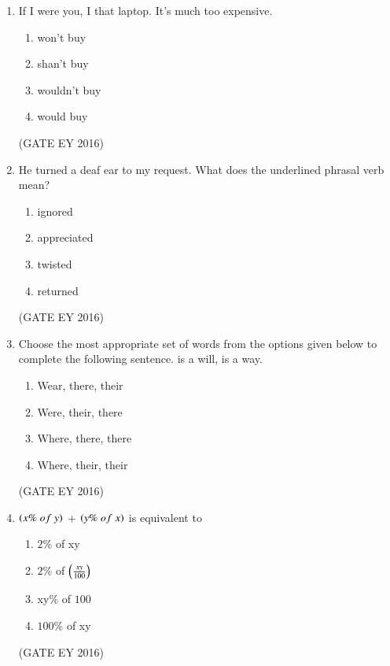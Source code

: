 \documentclass[journal]{IEEEtran}
\begin{document}
\begin{enumerate}[label=Q.\arabic*.]
    \item If I were you, I \underline{\hspace{3cm}} that laptop. It's much too expensive.
    \begin{multicols}{2}
    \begin{enumerate}
        \item won't buy
        \item shan't buy
        \item wouldn't buy
        \item would buy
    \end{enumerate}
    \end{multicols}
\hfill{(GATE EY 2016)}

    \item He turned a deaf ear to my request. What does the underlined phrasal verb mean?
    \begin{multicols}{4}
    \begin{enumerate}
        \item ignored
        \item appreciated
        \item twisted
        \item returned
    \end{enumerate}
    \end{multicols}
\hfill{(GATE EY 2016)}

    \item Choose the most appropriate set of words from the options given below to complete the following sentence. \underline{\hspace{2cm}} is a will, \underline{\hspace{2cm}} is a way.
    \begin{multicols}{2}
    \begin{enumerate}
        \item Wear, there, their
        \item Were, their, there
        \item Where, there, there
        \item Where, their, their
    \end{enumerate}
    \end{multicols}
\hfill{(GATE EY 2016)}

    \item $\left(x\%\ of\ y\right)$ + $\left(y\%\ of\ x\right)$ is equivalent to
    \begin{multicols}{4}
    \begin{enumerate}
        \item $2$\% of xy
        \item $2$\% of $\left(\frac{xy}{100}\right)$
        \item xy\% of $100$
        \item $100$\% of xy
    \end{enumerate}
    \end{multicols}
\hfill{(GATE EY 2016)}


\end{enumerate}
\end{document}
